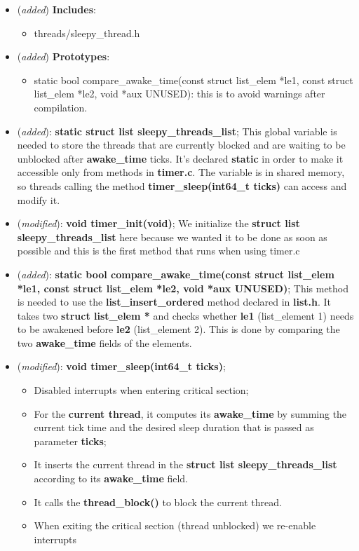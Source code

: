 \documentclass[11pt]{scrartcl}
\begin{document}
\begin{itemize}
    \item (\textit{added}) \textbf{Includes}:
    \begin{itemize}
        \item threads/sleepy\_thread.h
    \end{itemize}
    \item (\textit{added}) \textbf{Prototypes}:
    \begin{itemize}
    \item static bool compare\_awake\_time(const struct list\_elem *le1, const struct list\_elem *le2, void *aux UNUSED): this is to avoid warnings after compilation.
    \end{itemize}
    
    \item (\textit{added}): \textbf{static struct list sleepy\_threads\_list}; This global variable is needed to store the threads that are currently blocked and are waiting to be unblocked after \textbf{awake\_time} ticks. It's declared \textbf{static} in order to make it accessible only from methods in \textbf{timer.c}. The variable is in shared memory, so threads calling the method \textbf{timer\_sleep(int64\_t ticks)} can access and modify it.
    
    \item (\textit{modified}): \textbf{void timer\_init(void)};
    We initialize the \textbf{struct list sleepy\_threads\_list} here because we wanted it to be done as soon as possible and this is the first method that runs when using timer.c

    \item (\textit{added}): \textbf{static bool compare\_awake\_time(const struct list\_elem *le1, const struct list\_elem *le2, void *aux UNUSED)};
    This method is needed to use the \textbf{list\_insert\_ordered} method declared in \textbf{list.h}. It takes two \textbf{struct list\_elem *} and checks whether \textbf{le1} (list\_element 1) needs to be awakened before \textbf{le2} (list\_element 2). This is done by comparing the two \textbf{awake\_time} fields of the elements.

    \item (\textit{modified}): \textbf{void timer\_sleep(int64\_t ticks)};
    \begin{itemize}
    \item Disabled interrupts when entering critical section;
    \item For the \textbf{current thread}, it computes its \textbf{awake\_time} by summing the current tick time and the desired sleep duration that is passed as parameter \textbf{ticks};
    \item It inserts the current thread in the \textbf{struct list sleepy\_threads\_list} according to its \textbf{awake\_time} field.
    \item It calls the \textbf{thread\_block()} to block the current thread.
    \item When exiting the critical section (thread unblocked) we re-enable interrupts
    \end{itemize} 
    

\end{itemize}
\end{document}
